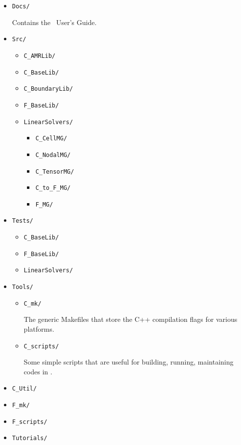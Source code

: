 \begin{itemize}

\item {\tt Docs/}

Contains the \BoxLib\ User's Guide.

\item {\tt Src/}

  \begin{itemize}

    \item {\tt C\_AMRLib/}
    \item {\tt C\_BaseLib/}
    \item {\tt C\_BoundaryLib/}
    \item {\tt F\_BaseLib/}
    \item {\tt LinearSolvers/}

    \begin{itemize}

      \item {\tt C\_CellMG/}
      \item {\tt C\_NodalMG/}
      \item {\tt C\_TensorMG/}
      \item {\tt C\_to\_F\_MG/}
      \item {\tt F\_MG/}

    \end{itemize}

  \end{itemize}

\item {\tt Tests/}

  \begin{itemize}

  \item {\tt C\_BaseLib/}
  \item {\tt F\_BaseLib/}
  \item {\tt LinearSolvers/}

  \end{itemize}

\item {\tt Tools/}

  \begin{itemize}

  \item {\tt C\_mk/}

  The generic Makefiles that store the C++ compilation flags for
  various platforms.

  \item {\tt C\_scripts/}

  Some simple scripts that are useful for building, running,
  maintaining codes in \BoxLib.

  \end{itemize}

  \item {\tt C\_Util/}
  \item {\tt F\_mk/}
  \item {\tt F\_scripts/}

\item {\tt Tutorials/}

\end{itemize}

